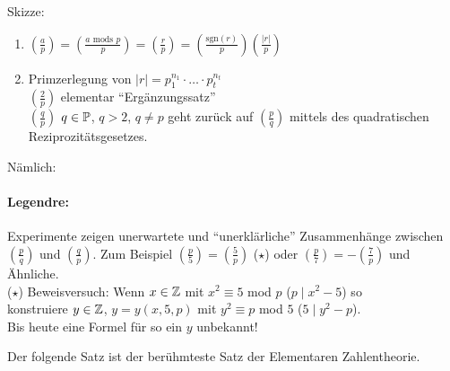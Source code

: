 \documentclass[a4paper,twoside,DIV15,BCOR12mm]{scrbook}
\begin{document}
Skizze:\\
\begin{enumerate}
\item $\left(\frac{a}{p}\right)=\left(\frac{a\mbox{ mods }p}{p}\right) = \left(\frac{r}{p}\right) = \left(\frac{\mbox{sgn}(r)}{p}\right)\left(\frac{|r|}{p}\right)$
\item Primzerlegung von $|r|=p_1^{n_1}\cdot \dotsc \cdot p_t^{n_t}$\\
$\left(\frac{2}{p}\right)$ elementar "`Ergänzungssatz"'\\
$\left(\frac{q}{p}\right)$ $q \in \mathbb{P}$, $q>2$, $q \neq p$ geht
zurück auf $\left(\frac{p}{q}\right)$ mittels des quadratischen
Reziprozitätsgesetzes.
\end{enumerate}
Nämlich:
\paragraph{Legendre:} Experimente zeigen unerwartete und "`unerklärliche"'
Zusammenhänge zwischen $\left(\frac{p}{q}\right)$ und
$\left(\frac{q}{p}\right)$. Zum Beispiel
$\left(\frac{p}{5}\right)=\left(\frac{5}{p}\right)$ ($\star$)
oder $\left(\frac{p}{7}\right)=-\left(\frac{7}{p}\right)$ und Ähnliche. \\
($\star$) Beweisversuch: Wenn $x \in \mathbb{Z}$ mit $x^2 \equiv 5$ mod $p$ ($p \mid x^2-5$) so \\
konstruiere $y \in \mathbb{Z}$, $y=y(x,5,p)$ mit $y^2 \equiv p$ mod $5$ ($5 \mid y^2-p$).\\
Bis heute eine Formel für so ein $y$ unbekannt!

Der folgende Satz ist der berühmteste Satz der Elementaren
Zahlentheorie.
\end{document}
